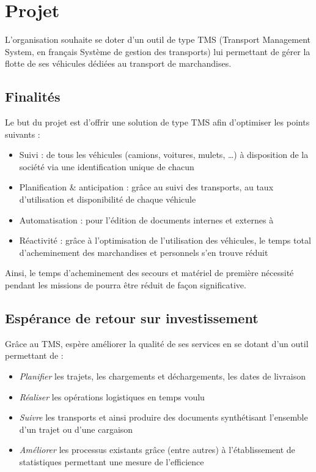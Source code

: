 \section{Projet}
L'organisation souhaite se doter d'un outil de type TMS (Transport Management System, en français Système de gestion des transports) lui permettant de gérer la flotte de ses véhicules dédiées au transport de marchandises.

\subsection{Finalités}
Le but du projet est d'offrir une solution de type TMS afin d'optimiser les points suivants :
\begin{itemize}
\item Suivi : de tous les véhicules (camions, voitures, mulets, …) à disposition de la société via une identification unique de chacun
\item Planification \& anticipation : grâce au suivi des transports, au taux d'utilisation et disponibilité de chaque véhicule
\item Automatisation : pour l'édition de documents internes et externes à \mo
\item Réactivité : grâce à l'optimisation de l'utilisation des véhicules, le temps total d'acheminement des marchandises et personnels s'en trouve réduit
\end{itemize}

Ainsi, le temps d'acheminement des secours et matériel de première nécessité pendant les missions de \mo pourra être réduit de façon significative.

\subsection{Espérance de retour sur investissement}

Grâce au TMS, \mo espère améliorer la qualité de ses services en se dotant d'un outil permettant de :
\begin{itemize}
	\item \emph{Planifier} les trajets, les chargements et déchargements, les dates de livraison
	\item \emph{Réaliser} les opérations logistiques en temps voulu
	\item \emph{Suivre} les transports et ainsi produire des documents synthétisant l'ensemble d'un trajet ou d'une cargaison
	\item \emph{Améliorer} les processus existants grâce (entre autres) à l'établissement de statistiques permettant une mesure de l'efficience
\end{itemize}

